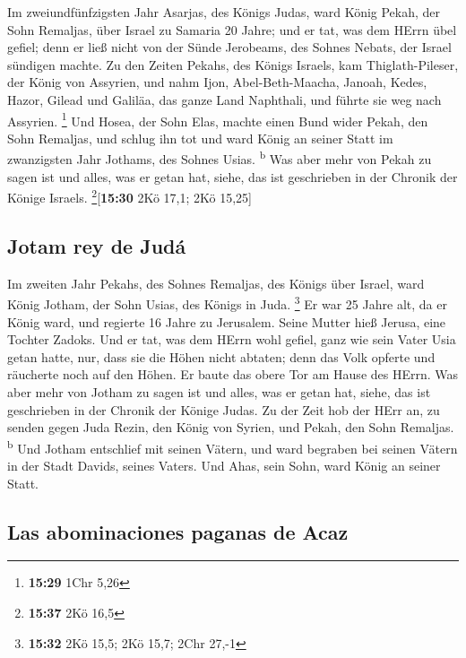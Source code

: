  Im zweiundfünfzigsten Jahr Asarjas, des Königs Judas,
ward König Pekah, der Sohn Remaljas, über Israel zu Samaria 20 Jahre;
 und er tat, was dem HErrn übel gefiel; denn er ließ
nicht von der Sünde Jerobeams, des Sohnes Nebats, der Israel sündigen
machte.  Zu den Zeiten Pekahs, des Königs Israels, kam
Thiglath-Pileser, der König von Assyrien, und nahm Ijon,
Abel-Beth-Maacha, Janoah, Kedes, Hazor, Gilead und Galiläa, das ganze
Land Naphthali, und führte sie weg nach Assyrien. \footnote{\textbf{15:29}
  1Chr 5,26}  Und Hosea, der Sohn Elas, machte einen Bund
wider Pekah, den Sohn Remaljas, und schlug ihn tot und ward König an
seiner Statt im zwanzigsten Jahr Jothams, des Sohnes Usias.
\textsuperscript{b}  Was aber mehr von Pekah zu sagen ist
und alles, was er getan hat, siehe, das ist geschrieben in der Chronik
der Könige Israels. \footnote{\textbf{15:37} 2Kö 16,5}{[}\textbf{15:30}
2Kö 17,1; 2Kö 15,25{]}

\hypertarget{jotam-rey-de-juduxe1}{%
\subsection{Jotam rey de Judá}\label{jotam-rey-de-juduxe1}}

 Im zweiten Jahr Pekahs, des Sohnes Remaljas, des Königs
über Israel, ward König Jotham, der Sohn Usias, des Königs in Juda.
\footnote{\textbf{15:32} 2Kö 15,5; 2Kö 15,7; 2Chr 27,-1} 
Er war 25 Jahre alt, da er König ward, und regierte 16 Jahre zu
Jerusalem. Seine Mutter hieß Jerusa, eine Tochter Zadoks.
 Und er tat, was dem HErrn wohl gefiel, ganz wie sein
Vater Usia getan hatte,  nur, dass sie die Höhen nicht
abtaten; denn das Volk opferte und räucherte noch auf den Höhen. Er
baute das obere Tor am Hause des HErrn.  Was aber mehr
von Jotham zu sagen ist und alles, was er getan hat, siehe, das ist
geschrieben in der Chronik der Könige Judas.  Zu der Zeit
hob der HErr an, zu senden gegen Juda Rezin, den König von Syrien, und
Pekah, den Sohn Remaljas. \textsuperscript{b}  Und Jotham
entschlief mit seinen Vätern, und ward begraben bei seinen Vätern in der
Stadt Davids, seines Vaters.  Und Ahas, sein Sohn, ward
König an seiner Statt.

\hypertarget{las-abominaciones-paganas-de-acaz}{%
\subsection{Las abominaciones paganas de
Acaz}\label{las-abominaciones-paganas-de-acaz}}


